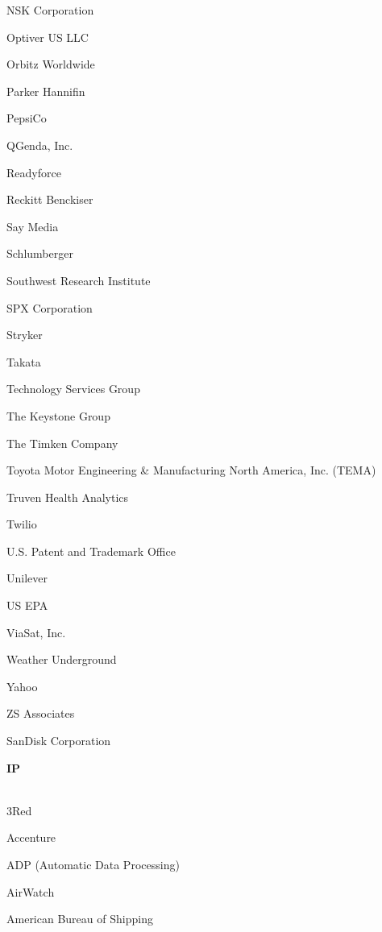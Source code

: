 \documentclass[twoside]{article}
\begin{document}
\begin{center}
\begin{multicols}{5}
\begin{FlushLeft}
\begin{compactitem}
\item NSK Corporation
\item Optiver US LLC
\item Orbitz Worldwide
\item Parker Hannifin
\item PepsiCo
\item QGenda, Inc.
\item Readyforce
\item Reckitt Benckiser
\item Say Media
\item Schlumberger
\item Southwest Research Institute
\item SPX Corporation
\item Stryker
\item Takata
\item Technology Services Group
\item The Keystone Group
\item The Timken Company
\item Toyota Motor Engineering \& Manufacturing North America, Inc. (TEMA)
\item Truven Health Analytics
\item Twilio
\item U.S. Patent and Trademark Office
\item Unilever
\item US EPA
\item ViaSat, Inc.
\item Weather Underground
\item Yahoo
\item ZS Associates
\item SanDisk Corporation
\end{compactitem}
        \end{FlushLeft}
        \vspace{1em}
        {\fontsize{14}{16}\selectfont \bf IP}\\
        \vspace{-1em}
        ~\hrulefill~
        \vspace{-.9em}
        \begin{FlushLeft}
        \begin{compactitem}
        \item 3Red
\item Accenture
\item ADP (Automatic Data Processing)
\item AirWatch
\item American Bureau of Shipping

\end{compactitem}
\end{FlushLeft}
\end{multicols}
\end{center}
\end{document}
